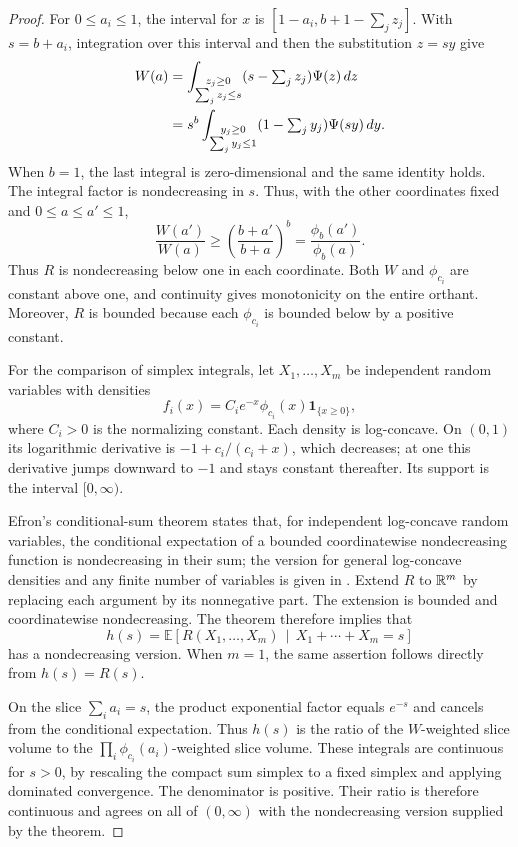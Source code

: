 \begin{proof}
For $0\le a_i\le1$, the interval for $x$ is
$[1-a_i,b+1-\sum_jz_j]$. With $s=b+a_i$, integration over this interval
and then the substitution $z=sy$ give
\begin{align}
 W(a)
 &=\int_{\substack{z_j\ge0\\\sum_jz_j\le s}}
       (s-\textstyle\sum_jz_j)\Psi(z)\,dz \notag\\
 &=s^b\int_{\substack{y_j\ge0\\\sum_jy_j\le1}}
       (1-\textstyle\sum_jy_j)\Psi(sy)\,dy.
 \label{branch:neighbour-integral}
\end{align}
When $b=1$, the last integral is zero-dimensional and the same identity
holds. The integral factor is nondecreasing in $s$. Thus, with the
other coordinates fixed and $0\le a\le a'\le1$,
\[
 \frac{W(a')}{W(a)}
 \ge\left(\frac{b+a'}{b+a}\right)^b
 =\frac{\phi_b(a')}{\phi_b(a)}.
\]
Thus $R$ is nondecreasing below one in each coordinate. Both $W$ and
$\phi_{c_i}$ are constant above one, and continuity gives monotonicity
on the entire orthant. Moreover, $R$ is bounded because each
$\phi_{c_i}$ is bounded below by a positive constant.

For the comparison of simplex integrals, let
$X_1,\ldots,X_m$ be independent random variables with densities
\[
 f_i(x)=C_i e^{-x}\phi_{c_i}(x)\mathbf 1_{\{x\ge0\}},
\]
where $C_i>0$ is the normalizing constant. Each density is log-concave.
On $(0,1)$ its logarithmic derivative is $-1+c_i/(c_i+x)$, which decreases;
at one this derivative jumps downward to $-1$ and stays constant
thereafter. Its support is the interval $[0,\infty)$.

Efron's conditional-sum theorem states that, for independent
log-concave random variables, the conditional expectation of a bounded
coordinatewise nondecreasing function is nondecreasing in their sum;
the version for general log-concave densities and any finite number
of variables is given in
\cite[Theorems~3.2--3.3]{saumardwellner2018}.
Extend $R$ to $\mathbb{R}^m$ by replacing each argument by its nonnegative
part. The extension is bounded and coordinatewise nondecreasing.
The theorem therefore implies that
\[
 h(s)=\mathbb E\!\left[
 R(X_1,\ldots,X_m)\,\middle|\,X_1+\cdots+X_m=s
 \right]
\]
has a nondecreasing version. When $m=1$, the same assertion follows
directly from $h(s)=R(s)$.

On the slice $\sum_i a_i=s$, the product exponential factor equals
$e^{-s}$ and cancels from the conditional expectation. Thus $h(s)$
is the ratio of the $W$-weighted slice volume to the
$\prod_i\phi_{c_i}(a_i)$-weighted slice volume. These integrals are
continuous for $s>0$, by rescaling the compact sum simplex to a fixed
simplex and applying dominated convergence. The denominator is
positive. Their ratio is therefore continuous and agrees on all of $(0,\infty)$
with the nondecreasing version supplied by the theorem.


\end{proof}
